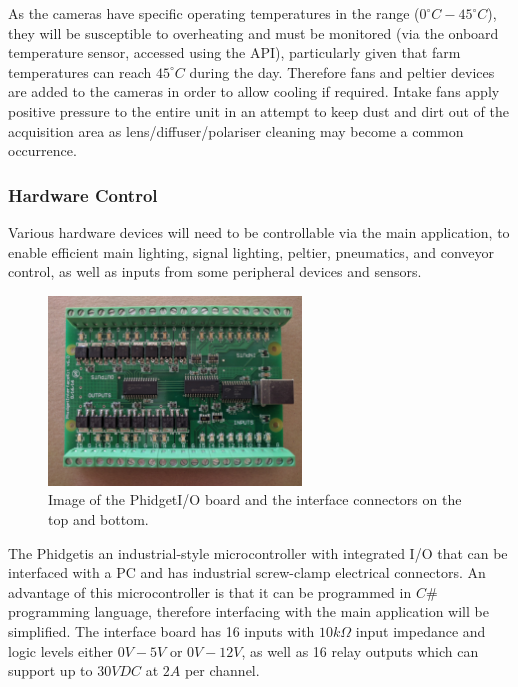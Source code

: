 \documentclass[fleqn,twoside,12pt]{report}
\begin{document}
As the cameras have specific operating temperatures in the range ($0^{\circ}C-45^{\circ}C$), they will be susceptible to overheating and must be monitored (via the onboard temperature sensor, accessed using the API), particularly given that farm temperatures can reach $45^{\circ}C$ during the day. Therefore fans and peltier devices are added to the cameras in order to allow cooling if required. Intake fans apply positive pressure to the entire unit in an attempt to keep dust and dirt out of the acquisition area as lens/diffuser/polariser cleaning may become a common occurrence.


\subsubsection{Hardware Control}
\label{sec:phidget}

Various hardware devices will need to be controllable via the main application, to enable efficient main lighting, signal lighting, peltier, pneumatics, and conveyor control, as well as inputs from some peripheral devices and sensors.

\begin{figure}
	\begin{center}
		\includegraphics[width=0.6\textwidth]{phidget.jpg}
	\end{center}
	\caption{Image of the Phidget\texttrademark I/O board and the interface connectors on the top and bottom.}
	\label{fig:phidget}
\end{figure} 

The Phidget\texttrademark is an industrial-style microcontroller with integrated I/O that can be interfaced with a PC and has industrial screw-clamp electrical connectors. An advantage of this microcontroller is that it can be programmed in $C\#$ programming language, therefore interfacing with the main application will be simplified. The interface board has 16 inputs with $10k\Omega$ input impedance and logic levels either $0V-5V$ or $0V-12V$, as well as 16 relay outputs which can support up to $30VDC$ at $2A$ per channel. 
\end{document}
